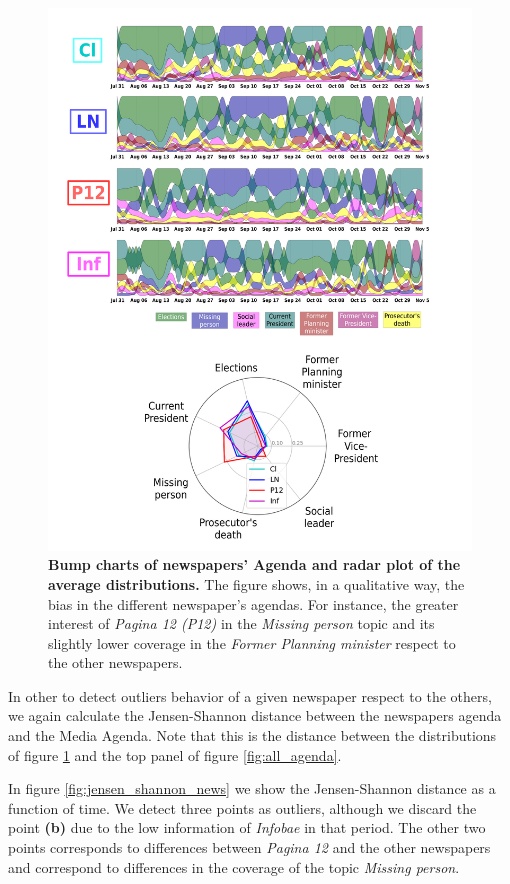 \documentclass[a4paper, 12pt]{article}
\begin{document}
\begin{figure}[h]
\centering
\includegraphics[width = \textwidth]{images/Fig5.pdf}
\caption{\textbf{Bump charts of newspapers' Agenda and radar plot of the average distributions.} The figure shows, in a qualitative way, the bias in the different newspaper's agendas. For instance, the greater interest of \emph{Pagina 12 (P12)} in the \emph{Missing person} topic and its slightly lower coverage in the \emph{Former Planning minister} respect to the other newspapers.}
\label{fig:news_agenda}
\end{figure}


\par In other to detect outliers behavior of a given newspaper respect to the others, we again calculate the Jensen-Shannon distance between the newspapers agenda and the Media Agenda.
Note that this is the distance between the distributions of figure \ref{fig:news_agenda} and the top panel of figure \ref{fig:all_agenda}.
\par In figure \ref{fig:jensen_shannon_news} we show the Jensen-Shannon distance as a function of time.
We detect three points as outliers, although we discard the point \textbf{(b)} due to the low information of \emph{Infobae} in that period. 
The other two points corresponds to differences between \emph{Pagina 12} and the other newspapers and correspond to differences in the coverage of the topic \emph{Missing person}.
\end{document}
